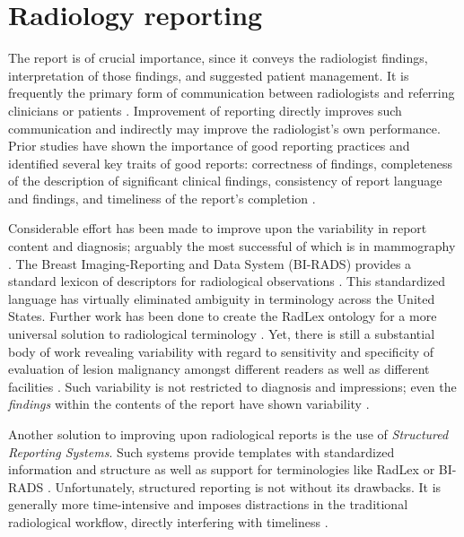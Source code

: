 \section*{Radiology reporting}
The report is of crucial importance, since it conveys the radiologist findings, interpretation of those findings, and suggested patient management. It is frequently the primary form of communication between radiologists and referring clinicians or patients \cite{Sistrom:2005cx}. Improvement of reporting directly improves such communication and indirectly may improve the radiologist's own performance. Prior studies have shown the importance of good reporting practices and identified several key traits of good reports: correctness of findings, completeness of the description of significant clinical findings, consistency of report language and findings, and timeliness of the report's completion \cite{Johnson:2004kh, HaraldO:2004hi}.

Considerable effort has been made to improve upon the variability in report content and diagnosis; arguably the most successful of which is in mammography \cite{Langlotz:2009fn,Burnside:2009ki}. The Breast Imaging-Reporting and Data System (BI-RADS) provides a standard lexicon of descriptors for radiological observations \cite{Liberman:ws}. This standardized language has virtually eliminated ambiguity in terminology across the United States. Further work has been done to create the RadLex ontology for a more universal solution to radiological terminology \cite{Langlotz:2006jn}. Yet, there is still a substantial body of work revealing variability with regard to sensitivity and specificity of evaluation of lesion malignancy amongst different readers as well as different facilities \cite{Jackson:2009fw, Beam:1996ui, Elmore:2002vc, Taplin:2008bv}. Such variability is not restricted to diagnosis and impressions; even the \emph{findings} within the contents of the report have shown variability \cite{Hobby:2000th, Robinson:1997uq}.

Another solution to improving upon radiological reports is the use of \emph{Structured Reporting Systems}. Such systems provide templates with standardized information and structure as well as support for terminologies like RadLex or BI-RADS \cite{Reiner:2009ib}. Unfortunately, structured reporting is not without its drawbacks. It is generally more time-intensive and imposes distractions in the traditional radiological workflow, directly interfering with timeliness \cite{Weiss:2008er}.

